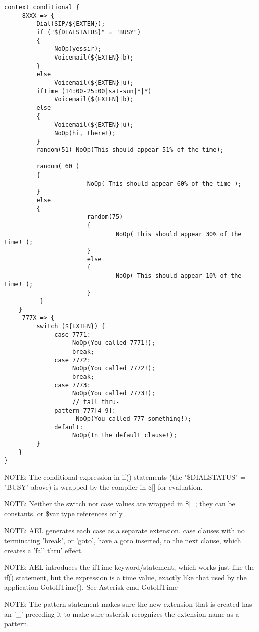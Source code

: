 {\begin{verbatim}
context conditional {
    _8XXX => {
         Dial(SIP/${EXTEN});
         if ("${DIALSTATUS}" = "BUSY")
         {
              NoOp(yessir);
              Voicemail(${EXTEN}|b);
         }
         else
              Voicemail(${EXTEN}|u);
         ifTime (14:00-25:00|sat-sun|*|*)
              Voicemail(${EXTEN}|b);
         else
         {
              Voicemail(${EXTEN}|u);
              NoOp(hi, there!);
         }
         random(51) NoOp(This should appear 51% of the time);

         random( 60 )
         {
                       NoOp( This should appear 60% of the time );
         }
         else
         {
                       random(75)
                       {
                               NoOp( This should appear 30% of the time! );
                       }
                       else
                       {
                               NoOp( This should appear 10% of the time! );
                       }
          }
    }
    _777X => {
         switch (${EXTEN}) {
              case 7771:
                   NoOp(You called 7771!);
                   break;
              case 7772:
                   NoOp(You called 7772!);
                   break;
              case 7773:
                   NoOp(You called 7773!);
                   // fall thru-
              pattern 777[4-9]:
                    NoOp(You called 777 something!);
              default:
                   NoOp(In the default clause!);
         }
    }
}
\end{verbatim}

NOTE: The conditional expression in if() statements (the
      "\${DIALSTATUS}" = "BUSY" above) is wrapped by the compiler in
      \$[] for evaluation.

NOTE: Neither the switch nor case values are wrapped in \$[ ]; they can
      be constants, or \${var} type references only.

NOTE: AEL generates each case as a separate extension. case clauses
      with no terminating 'break', or 'goto', have a goto inserted, to
      the next clause, which creates a 'fall thru' effect.

NOTE: AEL introduces the ifTime keyword/statement, which works just
      like the if() statement, but the expression is a time value,
      exactly like that used by the application GotoIfTime(). See
      Asterisk cmd GotoIfTime

NOTE: The pattern statement makes sure the new extension that is
      created has an '\_' preceding it to make sure asterisk recognizes
      the extension name as a pattern.

}
